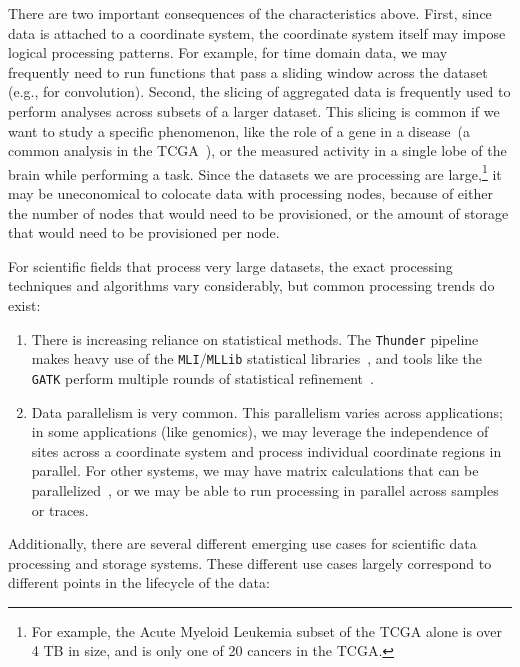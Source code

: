 \documentclass{sig-alternate}
\begin{document}
There are two important consequences of the characteristics above. First, since data is attached to a
coordinate system, the coordinate system itself may impose logical processing patterns. For example, for
time domain data, we may frequently need to run functions that pass a sliding window across the dataset (e.g., for
convolution). Second, the slicing of aggregated data is frequently used to perform analyses across
subsets of a larger dataset. This slicing is common if we want to study a specific phenomenon, like the role of a
gene in a disease~(a common analysis in the TCGA~\cite{weinstein13}), or the measured activity in a
single lobe of the brain while performing a task. Since the datasets we are processing are
large,\footnote{For example, the Acute Myeloid Leukemia subset of the TCGA alone is over 4 TB in size, and
is only one of 20 cancers in the TCGA.} it may be uneconomical to colocate data with processing nodes,
because of either the number of nodes that would need to be provisioned, or the amount of storage that would
need to be provisioned per node.

For scientific fields that process very large datasets, the exact processing techniques and algorithms vary
considerably, but common processing trends do exist:

\begin{enumerate}
\item There is increasing reliance on statistical methods. The \texttt{Thunder} pipeline makes heavy use
of the \texttt{MLI}/\texttt{MLLib} statistical libraries~\cite{freeman14, sparks13}, and tools like the \texttt{GATK} perform
multiple rounds of statistical refinement~\cite{depristo11}.
\item Data parallelism is very common. This parallelism varies across applications; in some applications (like
genomics), we may leverage the independence of sites across a coordinate system and process
individual coordinate regions in parallel. For other systems, we may have matrix calculations that can
be parallelized~\cite{sparks13}, or we may be able to run processing in parallel across samples or traces.
\end{enumerate}

Additionally, there are several different emerging use cases for scientific data processing and storage
systems. These different use cases largely correspond to different points in the lifecycle of the data:
\end{document}
